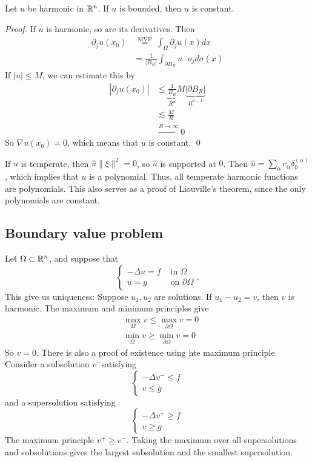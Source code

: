 \begin{theorem}
    [Liouville]
    Let $u$ be harmonic in $\mathbb{R}^n$. If $u$ is bounded, then $u$ is constant.
\end{theorem}
\begin{proof}
    If $u$ is harmonic, so are its derivatives. Then
$$
\begin{aligned}
\partial_j u\left(x_{0}\right) & \stackrel{\text { MVP }}{=} \int_{\Omega} \partial_{j} u(x) d x \\
&=\frac{1}{\left|B_{R}\right|} \int_{\partial B_{R}} u \cdot \nu_{j} d \sigma(x)
\end{aligned}
$$
If $|u| \leq M$, we can estimate this by
$$
\begin{aligned}
\left|\partial_{j} u\left(x_{0}\right)\right| & \leq \underbrace{\frac{1}{B_{R}}}_{R^{n}} M \underbrace{\left|\partial B_{R}\right|}_{R^{n-1}} \\
& \lesssim \frac{M}{R} \\
& \stackrel{R \rightarrow \infty}{\longrightarrow} 0
\end{aligned}
$$
So $\nabla u\left(x_{0}\right)=0$, which means that $u$ is constant.
\qed 
\end{proof}

\begin{remark}
    If $u$ is temperate, then $\hat{u}\|\xi\|^2 = 0$, so $\hat u$ is supported at $0$. Then $\hat u = \sum_{\alpha}c_\alpha \delta_0^{(\alpha)}$, which implies that $u$ is a polynomial. Thus, all temperate harmonic functions are polynomials. This also serves as a proof of Liouville's theorem, since the only polynomials are constant.
\end{remark}

\subsection{Boundary value problem}
Let $\Omega \subset \mathbb{R}^n$, and suppose that
\[
    \begin{cases}-\Delta u=f & \text { in } \Omega \\ u=g & \text { on } \partial \Omega\end{cases}.
\]
This give us uniqueness: Suppose $u_{1}, u_{2}$ are solutions. If $u_{1}-u_{2}=v$, then $v$ is harmonic. The maximum and minimum principles give
$$
\begin{aligned}
&\max _{\Omega} v \leq \max _{\partial \Omega} v=0 \\
&\min _{\Omega} v \geq \min _{\partial \Omega} v=0
\end{aligned}
$$
So $v=0$.
There is also a proof of existence using hte maximum principle. Consider a subsolution $v^{-}$satisfying
$$
\left\{\begin{array}{l}
-\Delta v^{-} \leq f \\
v \leq g
\end{array}\right.
$$
and a supersolution satisfying
$$
\left\{\begin{array}{l}
-\Delta v^{+} \geq f \\
v \geq g
\end{array}\right.
$$
The maximum principle $v^{+} \geq v^{-}$. Taking the maximum over all supersolutions and subsolutions gives the largest subsolution and the smallest supersolution.

